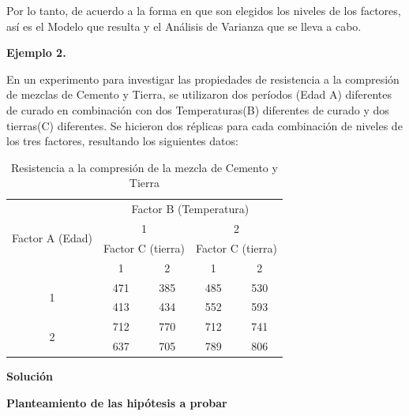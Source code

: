 \documentclass[12pt,letterpaper]{report}
\begin{document}
Por lo tanto, de acuerdo a la forma en que son elegidos los niveles de los factores, así es
el Modelo que resulta y el Análisis de Varianza que se lleva a cabo.

\textbf{Ejemplo 2.}

En un experimento para investigar las propiedades de resistencia a la compresión de
mezclas de Cemento y Tierra, se utilizaron dos períodos (Edad A) diferentes de curado en
combinación con dos Temperaturas(B) diferentes de curado y dos tierras(C) diferentes. Se
hicieron dos réplicas para cada combinación de niveles de los tres factores, resultando los
siguientes datos:

\begin{table}[htb]
\centering
\begin{tabular}{||c|c|c|c|c||}
\hline
\hline
\multirow{4}{*}{Factor A (Edad)} & \multicolumn{4}{c||}{Factor B (Temperatura)} \\
\cline{2-5}
                    & \multicolumn{2}{c|}{1} & \multicolumn{2}{c||}{2} \\
\cline{2-5}
                    & \multicolumn{2}{c|}{Factor C (tierra)} & \multicolumn{2}{c||}{Factor C (tierra)}\\
\cline{2-5}

                   & 1 & 2 & 1 & 2 \\
\hline
\multirow{2}{*}{1} &471&385&485&530 \\
                   &413&434&552&593 \\
\hline
\multirow{2}{*}{2} &712&770&712&741 \\
                   &637&705&789&806 \\
\hline
\hline

\end{tabular}
\caption{Resistencia a la compresión de la mezcla de Cemento y Tierra}
\end{table}

\textbf{Solución}

\textbf{Planteamiento de las hipótesis a probar}
\end{document}
